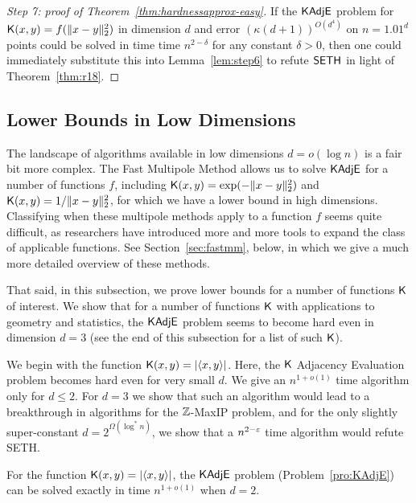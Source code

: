 \begin{proof}[Step 7: proof of Theorem~\ref{thm:hardnessapprox-easy}]
If the $\mathsf{KAdjE}$ problem for $\mathsf{K}(x,y) = f(\|x-y\|_2^2)$ in dimension $d$ and error $(\kappa(d+1))^{O(d^4)}$ on $n=1.01^d$ points could be solved in time time $n^{2-\delta}$ for any constant $\delta>0$, then one could immediately substitute this into Lemma~\ref{lem:step6} to refute $\mathsf{SETH}$ in light of Theorem~\ref{thm:r18}.
\end{proof}





\subsection{Lower Bounds in Low Dimensions}\label{sec:inner_product_kernel_matrix_vector_hardness}

The landscape of algorithms available in low dimensions $d = o(\log n)$ is a fair bit more complex. The Fast Multipole Method allows us to solve $\mathsf{KAdjE}$ for a number of functions $f$, including $\mathsf{K} (x,y) = \exp ( -  \| x - y \|_2^2 ) $ and $\mathsf{K} (x,y) = 1 / \| x - y \|_2^2$, for which we have a lower bound in high dimensions. Classifying when these multipole methods apply to a function $f$ seems quite difficult, as researchers have introduced more and more tools to expand the class of applicable functions. See Section~\ref{sec:fastmm}, below, in which we give a much more detailed overview of these methods.

That said, in this subsection, we prove lower bounds for a number of functions $\mathsf{K}$ of interest. We show that for a number of functions $\mathsf{K}$ with applications to geometry and statistics, the $\mathsf{KAdjE}$ problem seems to become hard even in dimension $d=3$ (see the end of this subsection for a list of such $\mathsf{K}$).

We begin with the function $\mathsf{K}(x,y) = |\langle x , y \rangle|$. Here, the $\mathsf{K}$ Adjacency Evaluation problem becomes hard even for very small $d$. We give an $n^{1 + o(1)}$ time algorithm only for $d \leq 2$. For $d=3$ we show that such an algorithm would lead to a breakthrough in algorithms for the ${\mathbb Z}$-{\sf MaxIP} problem, and for the only slightly super-constant $d = 2^{\Omega(\log^* n)}$, we show that a $n^{2-\varepsilon}$ time algorithm would refute {\sf SETH}.

\begin{lemma}
For the function $\mathsf{K}(x,y) = |\langle x , y \rangle|$, the $\mathsf{KAdjE}$ problem (Problem~\ref{pro:KAdjE}) can be solved exactly in time $n^{1 + o(1)}$ when $d=2$.
\end{lemma}

